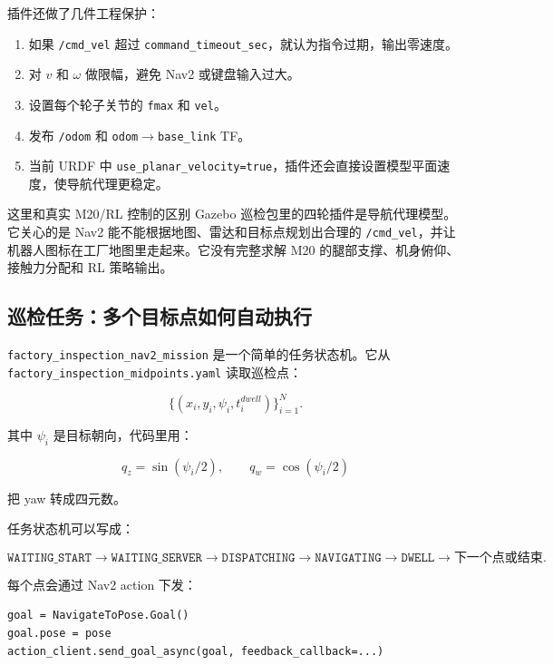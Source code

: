 \documentclass[UTF8,11pt,a4paper]{ctexart}
\begin{document}
插件还做了几件工程保护：

\begin{enumerate}
  \item 如果 \texttt{/cmd\_vel} 超过 \texttt{command\_timeout\_sec}，就认为指令过期，输出零速度。
  \item 对 \(v\) 和 \(\omega\) 做限幅，避免 Nav2 或键盘输入过大。
  \item 设置每个轮子关节的 \texttt{fmax} 和 \texttt{vel}。
  \item 发布 \texttt{/odom} 和 \texttt{odom}\(\rightarrow\)\texttt{base\_link} TF。
  \item 当前 URDF 中 \texttt{use\_planar\_velocity=true}，插件还会直接设置模型平面速度，使导航代理更稳定。
\end{enumerate}

\begin{orangebox}{这里和真实 M20/RL 控制的区别}
Gazebo 巡检包里的四轮插件是导航代理模型。它关心的是 Nav2 能不能根据地图、雷达和目标点规划出合理的
\texttt{/cmd\_vel}，并让机器人图标在工厂地图里走起来。它没有完整求解 M20 的腿部支撑、机身俯仰、接触力分配和 RL 策略输出。
\end{orangebox}

\subsection{巡检任务：多个目标点如何自动执行}

\texttt{factory\_inspection\_nav2\_mission} 是一个简单的任务状态机。它从
\texttt{factory\_inspection\_midpoints.yaml} 读取巡检点：

\[
\{(x_i,y_i,\psi_i,t_i^{dwell})\}_{i=1}^{N}.
\]

其中 \(\psi_i\) 是目标朝向，代码里用：

\[
q_z=\sin(\psi_i/2),\qquad
q_w=\cos(\psi_i/2)
\]

把 yaw 转成四元数。

任务状态机可以写成：

\[
\boxed{
\texttt{WAITING\_START}
\rightarrow
\texttt{WAITING\_SERVER}
\rightarrow
\texttt{DISPATCHING}
\rightarrow
\texttt{NAVIGATING}
\rightarrow
\texttt{DWELL}
\rightarrow
\text{下一个点或结束}.
}
\]

每个点会通过 Nav2 action 下发：

\begin{verbatim}
goal = NavigateToPose.Goal()
goal.pose = pose
action_client.send_goal_async(goal, feedback_callback=...)
\end{verbatim}
\end{document}
